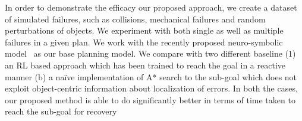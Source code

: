 %



In order to demonstrate the efficacy our proposed approach, we create a dataset of simulated failures, such as collisions, mechanical failures and random perturbations of objects. We experiment with both single as well as multiple failures in a given plan. We work with the recently proposed neuro-symbolic model~\cite{Kalithasan2022LearningNP} as our base planning model. We compare with two different baseline (1) an RL based approach which has been trained to reach the goal in a reactive manner (b) a na\"{i}ve implementation of A* search to the sub-goal which does not exploit object-centric information about localization of errors. In both the cases, our proposed method is able to do significantly better in terms of time taken to reach the sub-goal for recovery


